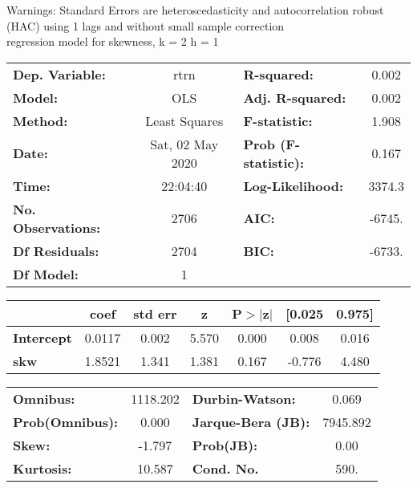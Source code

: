 Warnings: \newline
 [1] Standard Errors are heteroscedasticity and autocorrelation robust (HAC) using 1 lags and without small sample correction\\ 

regression model for skewness, k = 2 h = 1\begin{center}
\begin{tabular}{lclc}
\toprule
\textbf{Dep. Variable:}    &       rtrn       & \textbf{  R-squared:         } &     0.002   \\
\textbf{Model:}            &       OLS        & \textbf{  Adj. R-squared:    } &     0.002   \\
\textbf{Method:}           &  Least Squares   & \textbf{  F-statistic:       } &     1.908   \\
\textbf{Date:}             & Sat, 02 May 2020 & \textbf{  Prob (F-statistic):} &    0.167    \\
\textbf{Time:}             &     22:04:40     & \textbf{  Log-Likelihood:    } &    3374.3   \\
\textbf{No. Observations:} &        2706      & \textbf{  AIC:               } &    -6745.   \\
\textbf{Df Residuals:}     &        2704      & \textbf{  BIC:               } &    -6733.   \\
\textbf{Df Model:}         &           1      & \textbf{                     } &             \\
\bottomrule
\end{tabular}
\begin{tabular}{lcccccc}
                   & \textbf{coef} & \textbf{std err} & \textbf{z} & \textbf{P$> |$z$|$} & \textbf{[0.025} & \textbf{0.975]}  \\
\midrule
\textbf{Intercept} &       0.0117  &        0.002     &     5.570  &         0.000        &        0.008    &        0.016     \\
\textbf{skw}       &       1.8521  &        1.341     &     1.381  &         0.167        &       -0.776    &        4.480     \\
\bottomrule
\end{tabular}
\begin{tabular}{lclc}
\textbf{Omnibus:}       & 1118.202 & \textbf{  Durbin-Watson:     } &    0.069  \\
\textbf{Prob(Omnibus):} &   0.000  & \textbf{  Jarque-Bera (JB):  } & 7945.892  \\
\textbf{Skew:}          &  -1.797  & \textbf{  Prob(JB):          } &     0.00  \\
\textbf{Kurtosis:}      &  10.587  & \textbf{  Cond. No.          } &     590.  \\
\bottomrule
\end{tabular}
\end{center}

